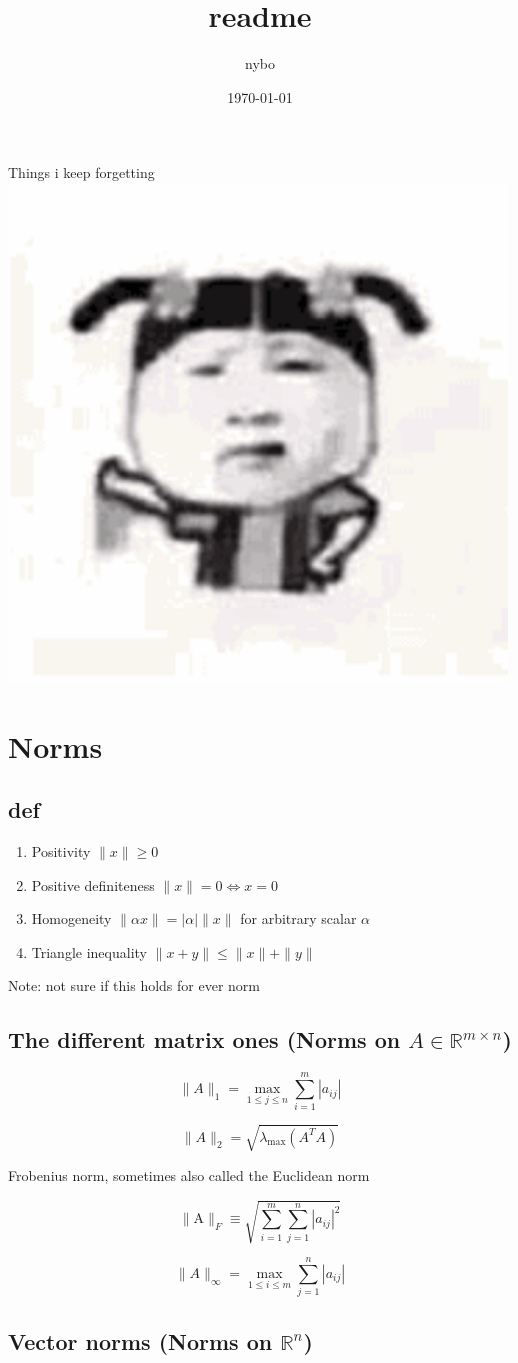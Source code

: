 \documentclass[12pt,a4paper]{article}
\author{nybo}
\date{\today}
\title{readme}
\begin{document}
\maketitle
\tableofcontents

Things i keep forgetting
\includegraphics[height=0.2\textwidth]{./imgs/5332.png}

\section{Norms}
\label{sec-1}
\subsection*{def}
\label{sec-1-1}
\begin{enumerate}
\item Positivity  $\|x\| \geq 0$
\item Positive definiteness $\|x\|=0 \Longleftrightarrow x=0$
\item Homogeneity $\|\alpha x\|=|\alpha|\|x\|$ for arbitrary scalar $\alpha$
\item Triangle inequality $\|x+y\| \leq\|x\|+\|y\|$
\end{enumerate}
Note: not sure if this holds for ever norm
\subsection*{The different matrix ones (Norms on $A \in \mathbb{R}^{m \times n}$)}
\label{sec-1-2}
$$
\|A\|_{1}=\max _{1 \leq j \leq n} \sum_{i=1}^{m}\left|a_{i j}\right|
$$

$$
\|A\|_{2}=\sqrt{\lambda_{\max }\left(A^{T} A\right)}
$$

Frobenius norm, sometimes also called the Euclidean norm

$$
\|\mathrm{A}\|_{F} \equiv \sqrt{\sum_{i=1}^{m} \sum_{j=1}^{n}\left|a_{i j}\right|^{2}}
$$

$$
\|A\|_{\infty}=\max _{1 \leq i \leq m} \sum_{j=1}^{n}\left|a_{i j}\right|
$$
\subsection*{Vector norms (Norms on $\mathbb{R}^{n}$)}
\label{sec-1-3}
\end{document}
